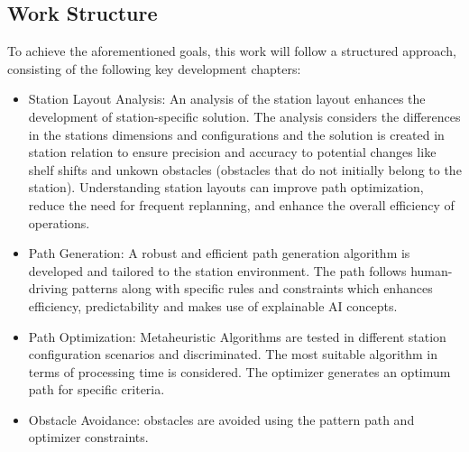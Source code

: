\subsection{Work Structure}
To achieve the aforementioned goals, this work will follow a structured approach, consisting of the following key 
development chapters: 

\begin{itemize}
    \item Station Layout Analysis: An analysis of the station layout enhances the development 
    of station-specific solution. The analysis considers the differences in the stations dimensions
    and configurations and the solution is created in station relation to ensure precision and accuracy
    to potential changes like shelf shifts and unkown obstacles (obstacles that do not initially 
    belong to the station). Understanding station layouts can improve path optimization, reduce the need for 
    frequent replanning, and enhance the overall efficiency of operations.

    \item Path Generation: A robust and efficient path generation algorithm is developed and tailored to 
    the station environment. The path follows human-driving patterns along with specific rules and constraints 
    which enhances efficiency, predictability and makes use of explainable AI concepts.

    \item Path Optimization: Metaheuristic Algorithms are tested in different station configuration scenarios 
    and discriminated. The most suitable algorithm in terms of processing time is considered. The optimizer 
    generates an optimum path for specific criteria. 

    \item Obstacle Avoidance: obstacles are avoided using the pattern path and optimizer constraints.

\end{itemize}

